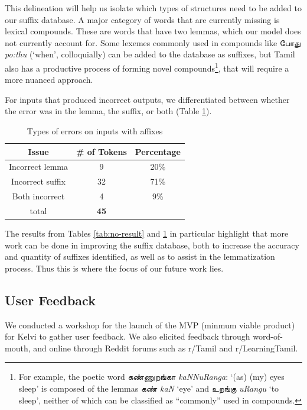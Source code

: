 \documentclass[11pt]{article}
\begin{document}
This delineation will help us isolate which types of 
structures need to be added to our suffix database. 
A major category of words that are currently missing is lexical compounds. 
These are words that have two lemmas, which our model does not currently account for. 
Some lexemes commonly used in compounds like \foreignlanguage{tamil}{போது} \textit{po:thu} (‘when’, colloquially) 
can be added to the database as suffixes, but Tamil also has a 
productive process of forming novel compounds\footnote{For example, the poetic word \foreignlanguage{tamil}{கண்ணுறங்கா} \textit{kaNNuRanga}: ‘(as) (my) eyes sleep’ is composed of the lemmas \foreignlanguage{tamil}{கண்} \textit{kaN} ‘eye’ and \foreignlanguage{tamil}{உறங்கு} \textit{uRangu} ‘to sleep’, neither of which can be classified as “commonly” used in compounds.}, that will require a more nuanced approach.

For inputs that produced incorrect outputs, we differentiated between 
whether the error was in the lemma, the suffix, or both (Table \ref{tab:output-incorrect}). 
\begin{table}[ht]
  \center
  \begin{tabular}{c|c|c}
    Issue & \# of Tokens & Percentage\\
    \hline
    Incorrect lemma & 9 & 20\% \\
    Incorrect suffix & 32 & 71\% \\
    Both incorrect & 4 & 9\% \\
    \hline
    total & \textbf{45} & \\
  \end{tabular}
  \caption{Types of errors on inputs with affixes}
  \label{tab:output-incorrect}
\end{table}
The results from Tables \ref{tab:no-result} and \ref{tab:output-incorrect} in particular highlight that more 
work can be done in improving the suffix database, both to increase 
the accuracy and quantity of suffixes identified, as well as to assist 
in the lemmatization process. Thus this is where the focus of our future work lies.

\subsection{User Feedback}
We conducted a workshop for the launch of the MVP (minmum viable product) for Kelvi to 
gather user feedback. We also elicited feedback through word-of-mouth, 
and online through Reddit forums such as r/Tamil and r/LearningTamil. 
\end{document}

